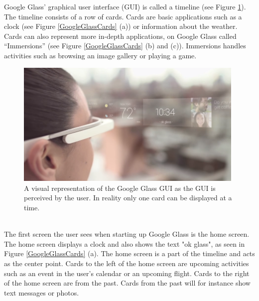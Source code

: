 Google Glass' graphical user interface (GUI) is called a timeline (see Figure \ref{GoogleGlassUI}).\cite{ImagesGoogleGlassUI} The timeline consists of a row of cards. Cards are basic applications such as a clock (see Figure \ref{GoogleGlassCards} (a)) or information about the weather. Cards can also represent more in-depth applications, on Google Glass called ``Immersions'' (see Figure \ref{GoogleGlassCards} (b) and (c)). Immersions handles activities such as browsing an image gallery or playing a game.
\\
	\begin{figure}[ht!]
		\centering
		\includegraphics[width=110mm]{images/GoogleGlassUI}
		\caption{A visual representation of the Google Glass GUI as the GUI is perceived by the user. In reality only one card can be displayed at a time.\cite{ImagesGoogleGlassUI}}
		\label{GoogleGlassUI}
	\end{figure}
\\
The first screen the user sees when starting up Google Glass is the home screen. The home screen displays a clock and also shows the text "ok glass", as seen in Figure \ref{GoogleGlassCards} (a). The home screen is a part of the timeline and acts as the center point. Cards to the left of the home screen are upcoming activities such as an event in the user's calendar or an upcoming flight. Cards to the right of the home screen are from the past. Cards from the past will for instance show text messages or photos.
\\
